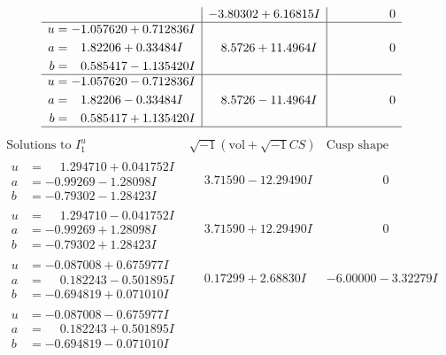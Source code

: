\documentclass[1p]{elsarticle_modified}
\theoremstyle{definition}
\newcommand{\I}{\sqrt{-1}}
\begin{document}
$$\begin{array}{c|c|c}
 & -3.80302 + 6.16815 I & \phantom{-0.000000 } 0 \\ \hline\begin{aligned}
u &= -1.057620 + 0.712836 I \\
a &= \phantom{-}1.82206 + 0.33484 I \\
b &= \phantom{-}0.585417 - 1.135420 I\end{aligned}
 & \phantom{-}8.5726 + 11.4964 I & \phantom{-0.000000 } 0 \\ \hline\begin{aligned}
u &= -1.057620 - 0.712836 I \\
a &= \phantom{-}1.82206 - 0.33484 I \\
b &= \phantom{-}0.585417 + 1.135420 I\end{aligned}
 & \phantom{-}8.5726 - 11.4964 I & \phantom{-0.000000 } 0\\
 \hline 
 \end{array}$$\newpage$$\begin{array}{c|c|c}  
\text{Solutions to }I^u_{1}& \I (\text{vol} + \sqrt{-1}CS) & \text{Cusp shape}\\
 \hline 
\begin{aligned}
u &= \phantom{-}1.294710 + 0.041752 I \\
a &= -0.99269 - 1.28098 I \\
b &= -0.79302 - 1.28423 I\end{aligned}
 & \phantom{-}3.71590 - 12.29490 I & \phantom{-0.000000 } 0 \\ \hline\begin{aligned}
u &= \phantom{-}1.294710 - 0.041752 I \\
a &= -0.99269 + 1.28098 I \\
b &= -0.79302 + 1.28423 I\end{aligned}
 & \phantom{-}3.71590 + 12.29490 I & \phantom{-0.000000 } 0 \\ \hline\begin{aligned}
u &= -0.087008 + 0.675977 I \\
a &= \phantom{-}0.182243 - 0.501895 I \\
b &= -0.694819 + 0.071010 I\end{aligned}
 & \phantom{-}0.17299 + 2.68830 I & -6.00000 - 3.32279 I \\ \hline\begin{aligned}
u &= -0.087008 - 0.675977 I \\
a &= \phantom{-}0.182243 + 0.501895 I \\
b &= -0.694819 - 0.071010 I\end{aligned}

\end{array}$$
\end{document}
